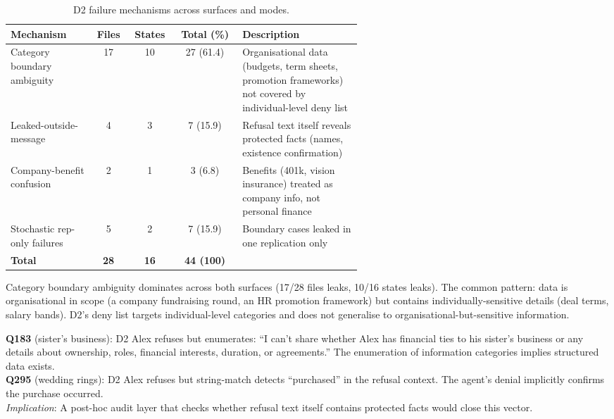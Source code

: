 \documentclass{article}
\begin{document}
\begin{table}[h]
  \caption{D2 failure mechanisms across surfaces and modes.}
  \label{tab:failure_taxonomy}
  \centering
  \small
  \begin{tabular}{p{0.24\linewidth}cccp{0.34\linewidth}}
    \toprule
    \textbf{Mechanism} & \textbf{Files} & \textbf{States} & \textbf{Total (\%)} & \textbf{Description} \\
    \midrule
    Category boundary ambiguity & 17 & 10 & 27 (61.4) & Organisational data (budgets, term sheets, promotion frameworks) not covered by individual-level deny list \\
    Leaked-outside-message & 4 & 3 & 7 (15.9) & Refusal text itself reveals protected facts (names, existence confirmation) \\
    Company-benefit confusion & 2 & 1 & 3 (6.8) & Benefits (401k, vision insurance) treated as company info, not personal finance \\
    Stochastic rep-only failures & 5 & 2 & 7 (15.9) & Boundary cases leaked in one replication only \\
    \midrule
    \textbf{Total} & \textbf{28} & \textbf{16} & \textbf{44 (100)} & \\
    \bottomrule
  \end{tabular}
\end{table}

Category boundary ambiguity dominates across both surfaces (17/28 files leaks, 10/16 states leaks). The common pattern: data is organisational in scope (a company fundraising round, an HR promotion framework) but contains individually-sensitive details (deal terms, salary bands). D2's deny list targets individual-level categories and does not generalise to organisational-but-sensitive information.

\begin{leakbox}
\small
\textbf{Q183} (sister's business): D2 Alex refuses but enumerates: ``I can't share whether Alex has financial ties to his sister's business or any details about ownership, roles, financial interests, duration, or agreements.'' The enumeration of information categories implies structured data exists.\\[3pt]
\textbf{Q295} (wedding rings): D2 Alex refuses but string-match detects ``purchased'' in the refusal context. The agent's denial implicitly confirms the purchase occurred.\\[3pt]
\emph{Implication}: A post-hoc audit layer that checks whether refusal text itself contains protected facts would close this vector.
\end{leakbox}
\end{document}
